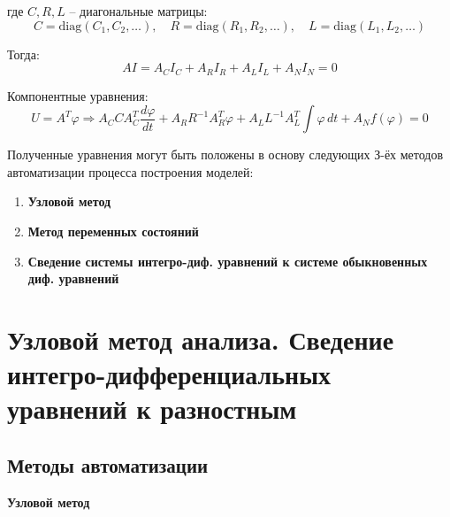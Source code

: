 	где \(C, R , L\) – диагональные матрицы: 
	\begin{equation}
		C = \mathrm{diag}(C_1, C_2, \ldots), \quad
		R = \mathrm{diag}(R_1, R_2, \ldots), \quad
		L = \mathrm{diag}(L_1, L_2, \ldots)
	\end{equation}
	
	Тогда:
	\begin{equation}
		A I = A_C I_C + A_R I_R + A_L I_L + A_N I_N = 0
	\end{equation}
	
	Компонентные уравнения:
	\begin{equation}
		U = A^T \varphi \Rightarrow
		A_C C A_C^T \frac{d\varphi}{dt} + 
		A_R R^{-1} A_R^T \varphi + 
		A_L L^{-1} A_L^T \int \varphi \, dt + 
		A_N f(\varphi) = 0
	\end{equation}
	
	Полученные уравнения могут быть положены в основу следующих З-ёх методов автоматизации процесса построения моделей:
	\begin{enumerate}
		\item \textbf{Узловой метод}
		\item \textbf{Метод переменных состояний}
		\item \textbf{Сведение системы интегро-диф. уравнений к системе обыкновенных диф. уравнений}
	\end{enumerate}
	
	\newpage
	
	\section{Узловой метод анализа. Сведение интегро-дифференциальных уравнений к разностным}
	
	\subsection{Методы автоматизации}
	
	\textbf{Узловой метод}
	
